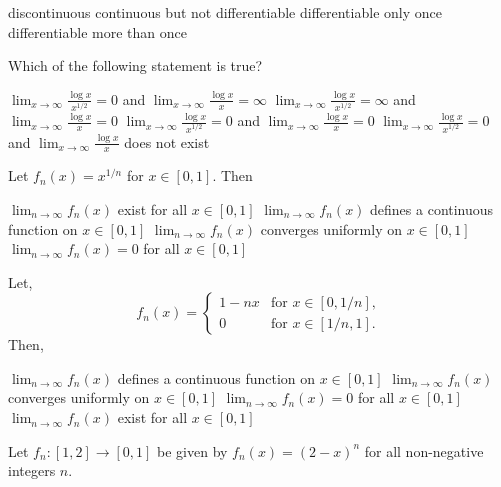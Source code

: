 \documentclass[10pt]{exam}
\begin{document}
\begin{questions}
\begin{choices}
\choice discontinuous
\choice continuous but not differentiable
\choice differentiable only once
\choice differentiable more than once
\end{choices}

\question
Which of the following statement is true?
\begin{choices}
\choice $ \lim_{x \rightarrow \infty} \frac{\log x}{x^{1/2}} =0$ and $ \lim_{x \rightarrow \infty} \frac{\log x}{x} = \infty$
\choice $ \lim_{x \rightarrow \infty} \frac{\log x}{x^{1/2}} =\infty$ and $ \lim_{x \rightarrow \infty} \frac{\log x}{x} = 0$
\choice $ \lim_{x \rightarrow \infty} \frac{\log x}{x^{1/2}} =0$ and $ \lim_{x \rightarrow \infty} \frac{\log x}{x} = 0$
\choice $ \lim_{x \rightarrow \infty} \frac{\log x}{x^{1/2}} =0$ and $ \lim_{x \rightarrow \infty} \frac{\log x}{x}$ does not exist 
\end{choices}

\question
Let $f_n(x)=x^{1/n}$ for $x\in [0,1]$. Then

\begin{choices}
\choice $\lim_{n \rightarrow \infty} f_n(x)$ exist for all $x \in [0,1]$
\choice $\lim_{n \rightarrow \infty} f_n(x)$ defines a continuous function on $x \in [0,1]$
\choice $\lim_{n \rightarrow \infty} f_n(x)$ converges uniformly on $x \in [0,1]$
\choice $\lim_{n \rightarrow \infty} f_n(x)=0$ for all $x \in [0,1]$
\end{choices}

\question
Let, 
\begin{equation}
f_n(x)=
\begin{cases}
1-nx& \text{for } x\in [0,1/n],\\
0& \text{for } x \in [1/n,1].
\end{cases}
\end{equation}
Then,

\begin{choices}
\choice $\lim_{n \rightarrow \infty} f_n(x)$ defines a continuous function on $x \in [0,1]$
\choice $\lim_{n \rightarrow \infty} f_n(x)$ converges uniformly on $x \in [0,1]$
\choice $\lim_{n \rightarrow \infty} f_n(x)=0$ for all $x \in [0,1]$
\choice $\lim_{n \rightarrow \infty} f_n(x)$ exist for all $x \in [0,1]$
\end{choices}


\question
Let $f_n:[1,2] \rightarrow [0,1]$ be given by $f_n(x)=(2-x)^n$ for all non-negative integers $n$.


\end{questions}
\end{document}
